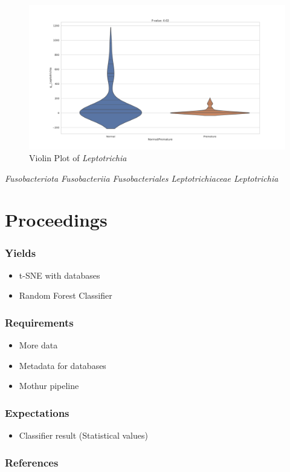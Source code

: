 \documentclass{beamer}
\begin{document}
\begin{frame}[allowframebreaks]
        \begin{figure}[h!]
            \includegraphics[width=0.8 \linewidth]{figures/RandomForest/case1/feature.png}
            \caption{Violin Plot of \textit{Leptotrichia}}
        \end{figure}
        \textit{Fusobacteriota Fusobacteriia Fusobacteriales Leptotrichiaceae Leptotrichia}
    \end{frame}

    \section{Proceedings}
    \begin{frame}[allowframebreaks]
        \frametitle{Yields}

        \begin{itemize}
            \item t-SNE with databases
            \item Random Forest Classifier
        \end{itemize}
    \end{frame}

    \begin{frame}[allowframebreaks]
        \frametitle{Requirements}

        \begin{itemize}
            \item More data
            \item Metadata for databases
            \item Mothur pipeline
        \end{itemize}
    \end{frame}

    \begin{frame}[allowframebreaks]
        \frametitle{Expectations}

        \begin{itemize}
            \item Classifier result (Statistical values)
        \end{itemize}
    \end{frame}

   	\begin{frame}[allowframebreaks]
        \frametitle{References}
        
        
    \end{frame}
\end{document}
